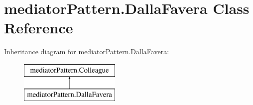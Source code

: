 \hypertarget{classmediator_pattern_1_1_dalla_favera}{}\section{mediator\+Pattern.\+Dalla\+Favera Class Reference}
\label{classmediator_pattern_1_1_dalla_favera}
Inheritance diagram for mediator\+Pattern.\+Dalla\+Favera\+:\begin{figure}[H]
\begin{center}
\leavevmode
\includegraphics[height=2.000000cm]{classmediator_pattern_1_1_dalla_favera}
\end{center}
\end{figure}
